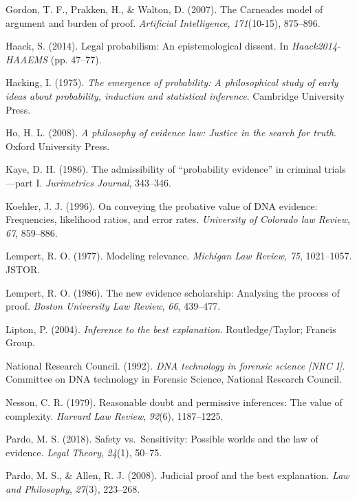 \documentclass[11pt,dvipsnames,enabledeprecatedfontcommands]{scrartcl}
\begin{document}
\hypertarget{ref-gordon2007}{}
Gordon, T. F., Prakken, H., \& Walton, D. (2007). The Carneades model of
argument and burden of proof. \emph{Artificial Intelligence},
\emph{171}(10-15), 875--896.

\hypertarget{ref-haack2011legal}{}
Haack, S. (2014). Legal probabilism: An epistemological dissent. In
\emph{Haack2014-HAAEMS} (pp. 47--77).

\hypertarget{ref-Hacking1984}{}
Hacking, I. (1975). \emph{The emergence of probability: A philosophical
study of early ideas about probability, induction and statistical
inference}. Cambridge University Press.

\hypertarget{ref-ho2008philosophy}{}
Ho, H. L. (2008). \emph{A philosophy of evidence law: Justice in the
search for truth}. Oxford University Press.

\hypertarget{ref-kaye1986admissibility}{}
Kaye, D. H. (1986). The admissibility of ``probability evidence'' in
criminal trials---part I. \emph{Jurimetrics Journal}, 343--346.

\hypertarget{ref-Koehler1996On-Conveying-th}{}
Koehler, J. J. (1996). On conveying the probative value of DNA evidence:
Frequencies, likelihood ratios, and error rates. \emph{University of
Colorado law Review}, \emph{67}, 859--886.

\hypertarget{ref-lempert1977modeling}{}
Lempert, R. O. (1977). Modeling relevance. \emph{Michigan Law Review},
\emph{75}, 1021--1057. JSTOR.

\hypertarget{ref-Lempert1986}{}
Lempert, R. O. (1986). The new evidence scholarship: Analysing the
process of proof. \emph{Boston University Law Review}, \emph{66},
439--477.

\hypertarget{ref-Lipton2004-LIPITT}{}
Lipton, P. (2004). \emph{Inference to the best explanation}.
Routledge/Taylor; Francis Group.

\hypertarget{ref-NRCI1992}{}
National Research Council. (1992). \emph{DNA technology in forensic
science \textup{{[}NRC I{]}}}. Committee on DNA technology in Forensic
Science, National Research Council.

\hypertarget{ref-Nesson1979Reasonable-doub}{}
Nesson, C. R. (1979). Reasonable doubt and permissive inferences: The
value of complexity. \emph{Harvard Law Review}, \emph{92}(6),
1187--1225.

\hypertarget{ref-pardo2018}{}
Pardo, M. S. (2018). Safety vs.~Sensitivity: Possible worlds and the law
of evidence. \emph{Legal Theory}, \emph{24}(1), 50--75.

\hypertarget{ref-Pardo2008judicial}{}
Pardo, M. S., \& Allen, R. J. (2008). Judicial proof and the best
explanation. \emph{Law and Philosophy}, \emph{27}(3), 223--268.
\end{document}

